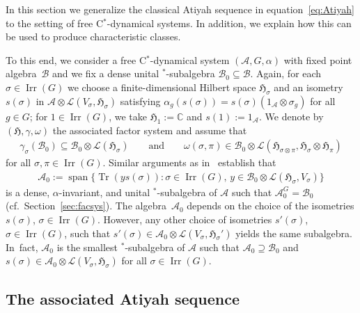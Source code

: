 \documentclass[10pt,a4paper]{amsart}
\numberwithin{equation}{section}
\newcommand*{\C}{\mathbb C}		%
\newcommand*{\tensor}{\otimes}		%
\DeclareMathOperator{\Span}{span}
\DeclareMathOperator{\Tr}{Tr}		%
\newcommand*{\Star}{$^*$\nobreakdash}
\newcommand*{\hilb}{\mathfrak}		%
\newcommand*{\alg}{\mathcal}		%
\newcommand*{\hH}{\hilb{H}}			%
\newcommand*{\one}{1}				%
\newcommand*{\aA}{\alg{A}}			%
\newcommand*{\aB}{\alg{B}} 			%
\newcommand*{\End}{\mathcal{L}} %
\DeclareMathOperator{\Irrep}{Irr} 			%
\begin{document}
In this section we generalize the classical Atiyah sequence in equation~\eqref{eq:Atiyah} to the setting of free C\Star-dynamical systems.
In addition, we explain how this can be used to produce characteristic classes.

To this end, we consider a free C\Star-dynamical system $(\aA,G,\alpha)$ with fixed point algebra~$\aB$ and we fix a dense unital \Star-subalgebra $\aB_0 \subseteq \aB$.
Again, for each $\sigma \in \Irrep(G)$ we choose a finite-dimensional Hilbert space $\hH_\sigma$ and an isometry $s(\sigma)$ in $\aA \tensor \End(V_\sigma,\hH_\sigma)$ satisfying $\alpha_g(s(\sigma))=s(\sigma) (\one_\aA \tensor \sigma_g)$ for all $g \in G$; for $1 \in \Irrep(G)$, we take $\hH_1 := \C$ and $s(1) := \one_\aA$.
We denote by $(\hH, \gamma, \omega)$ the associated factor system and assume that
\begin{gather*}
	\gamma_\sigma(\aB_0) \subseteq \aB_0 \tensor \End(\hH_\sigma)
	\qquad \text{and}
\qquad
\omega(\sigma, \pi) \in \aB_0 \tensor \End(\hH_{\sigma \tensor \pi},\hH_\sigma \tensor \hH_\pi)
\end{gather*}
for all $\sigma, \pi \in \Irrep(G)$.
Similar arguments as in~\cite[Section~5.1]{SchWa20} establish that
\begin{gather*}
	\aA_0 := \Span \bigl\{ \Tr ( y s(\sigma) ) \colon \sigma \in \Irrep(G), \, y \in \aB_0 \tensor \End(\hH_\sigma,V_\sigma) \bigr\}
\end{gather*}
is a dense, $\alpha$-invariant, and unital \Star-subalgebra of $\aA$ such that $\aA_0^G = \aB_0$ (cf.\ Section~\ref{sec:facsys}).
The algebra~$\aA_0$ depends on the choice of the isometries $s(\sigma)$, $\sigma \in \Irrep(G)$.
However, any other choice of isometries $s'(\sigma)$, $\sigma \in \Irrep(G)$, such that $s'(\sigma) \in \aA_0 \tensor \End(V_\sigma, \hH_\sigma')$ yields the same subalgebra.
In~fact, $\aA_0$ is the smallest \Star-subalgebra of $\aA$ such that $\aA_0 \supseteq \aB_0$ and $s(\sigma) \in \aA_0 \tensor \End(V_\sigma, \hH_\sigma)$ for all $\sigma \in \Irrep(G)$.

\subsection{The associated Atiyah sequence}
\end{document}
